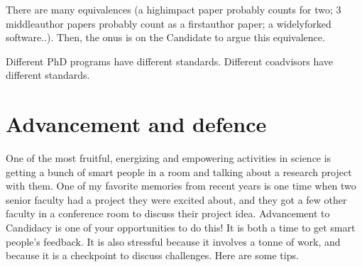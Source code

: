 \documentclass[letterpaper,10pt,english]{sphinxmanual}
\begin{document}
\sphinxAtStartPar
There are many equivalences (a high\sphinxhyphen{}impact paper probably counts for two; 3 middle\sphinxhyphen{}author papers probably count as a first\sphinxhyphen{}author paper; a widely\sphinxhyphen{}forked software..). Then, the onus is on the Candidate to argue this equivalence.

\sphinxAtStartPar
Different PhD programs have different standards.
Different co\sphinxhyphen{}advisors have different standards.


\section{Advancement and defence}
\label{\detokenize{04WhatIsAPhD:advancement-and-defence}}
\sphinxAtStartPar
One of the most fruitful, energizing and empowering activities in science is getting a bunch of smart people in a room and talking about a research project with them.
One of my favorite memories from recent years is one time when two senior faculty had a project they were excited about, and they got a few other faculty in a conference room to discuss their project idea.
Advancement to Candidacy is one of your opportunities to do this! It is both a time to get smart people’s feedback. It is also stressful because it involves a tonne of work, and because it is a checkpoint to discuss challenges. Here are some tips.
\end{document}
